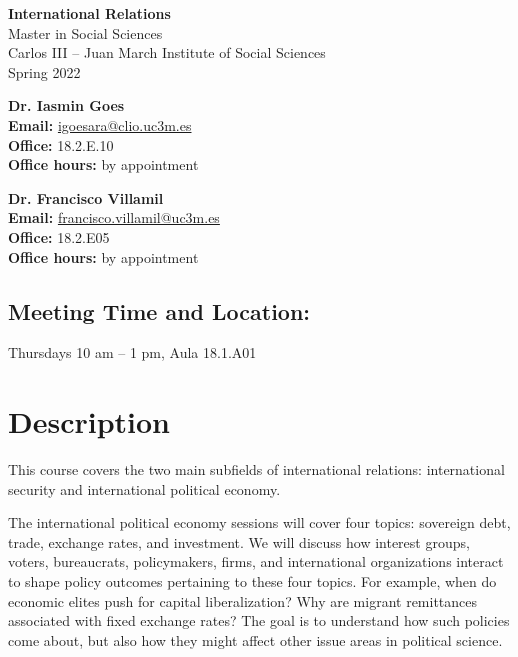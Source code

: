 \documentclass[12pt, a4paper]{article}
\begin{document}
\begin{center}
{\Large \textbf{International Relations}}\\\vspace{10pt}
Master in Social Sciences\\
Carlos III -- Juan March Institute of Social Sciences\\
Spring 2022\\
\end{center}

\vspace{20pt}

\begin{minipage}{0.48\textwidth}
\textbf{Dr. Iasmin Goes}\\
\textbf{Email:} \url{igoesara@clio.uc3m.es}\\
\textbf{Office:} 18.2.E.10\\
\textbf{Office hours:} by appointment
\end{minipage}\hfill
\begin{minipage}{0.48\textwidth}
\textbf{Dr. Francisco Villamil}\\
\textbf{Email:} \url{francisco.villamil@uc3m.es}\\
\textbf{Office:} 18.2.E05\\
\textbf{Office hours:} by appointment
\end{minipage}

\vspace{10pt}
\subsection*{Meeting Time and Location:}

Thursdays 10 am -- 1 pm, Aula 18.1.A01

\section{Description}

This course covers the two main subfields of international relations: international security and international political economy.

The international political economy sessions will cover four topics: sovereign debt, trade, exchange rates, and investment. We will discuss how interest groups, voters, bureaucrats, policymakers, firms, and international organizations interact to shape policy outcomes pertaining to these four topics. For example, when do economic elites push for capital liberalization? Why are migrant remittances associated with fixed exchange rates? The goal is to understand how such policies come about, but also how they might affect other issue areas in political science.
\end{document}
